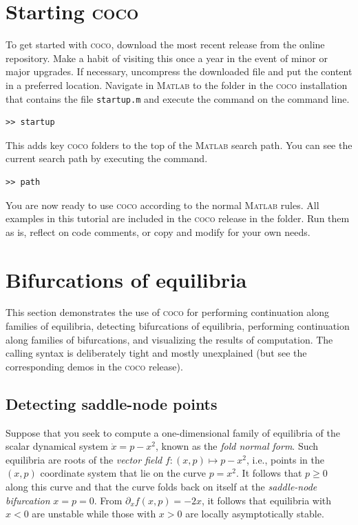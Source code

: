 \section{Starting \textsc{coco}}
To get started with \textsc{coco}, download the most recent release from the online repository. Make a habit of visiting this once a year in the event of minor or major upgrades. If necessary, uncompress the downloaded file and put the content in a preferred location. Navigate in \textsc{Matlab} to the folder in the \textsc{coco}  installation that contains the file \texttt{startup.m} and execute the  command on the command line.
\begin{lstlisting}[language=coco-highlight,frame=lines]
>> startup
\end{lstlisting}
This adds key \textsc{coco} folders to the top of the \textsc{Matlab} search path. You can see the current search path by executing the  command.
\begin{lstlisting}[language=coco-highlight,frame=lines]
>> path
\end{lstlisting}
You are now ready to use \textsc{coco} according to the normal \textsc{Matlab} rules. All examples in this tutorial are included in the \textsc{coco} release in the  folder. Run them as is, reflect on code comments, or copy and modify for your own needs.

\section{Bifurcations of equilibria}

This section demonstrates the use of \textsc{coco} for performing continuation along families of equilibria, detecting bifurcations of equilibria, performing continuation along families of bifurcations, and visualizing the results of computation. The calling syntax is deliberately tight and mostly unexplained (but see the corresponding demos in the \textsc{coco} release).

\subsection{Detecting saddle-node points}
\label{sec: Detecting saddle-node points}
Suppose that you seek to compute a one-dimensional family of equilibria of the scalar dynamical system $\dot{x}=p-x^2$, known as the \textit{fold normal form}. Such equilibria are roots of the \textit{vector field} $f:(x,p)\mapsto p-x^2$, i.e., points in the $(x,p)$ coordinate system that lie on the curve $p=x^2$. It follows that $p\ge 0$ along this curve and that the curve folds back on itself at the \textit{saddle-node bifurcation} $x=p=0$. From $\partial_xf(x,p)=-2x$, it follows that equilibria with $x<0$ are unstable while those with $x>0$ are locally asymptotically stable.

